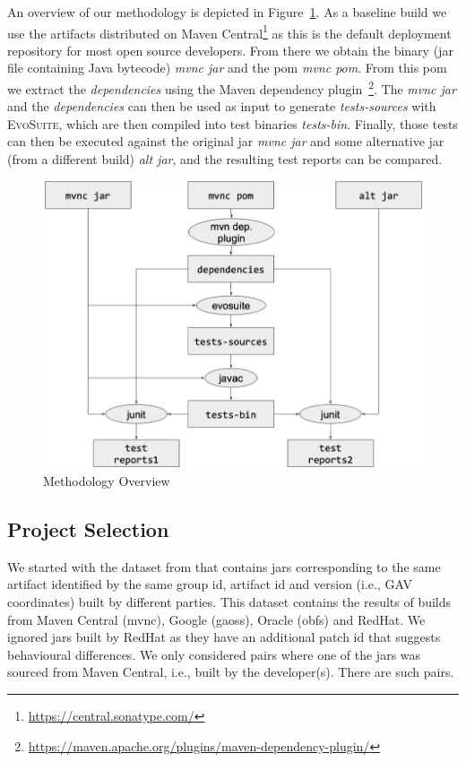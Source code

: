 \documentclass[conference]{IEEEtran}
\makeatletter
\newcommand{\evosuite}{\textsc{EvoSuite}\@\xspace}
\newcommand{\inputgen}[1]{\unskip}
\makeatother
\begin{document}
An overview of our methodology is depicted in Figure~\ref{fig:methodology}.  As a baseline build we use the artifacts distributed on Maven Central\footnote{\url{https://central.sonatype.com/}} as this is the default deployment repository for most open source developers.  From there we obtain the binary (jar file containing Java bytecode) \textit{mvnc jar} and the pom \textit{mvnc pom}. From this pom we extract the \textit{dependencies} using the Maven dependency plugin~\footnote{\url{https://maven.apache.org/plugins/maven-dependency-plugin/}}.  The \textit{mvnc jar} and the \textit{dependencies} can then be used as input to generate \textit{tests-sources} with \evosuite, which are then compiled into test binaries \textit{tests-bin}.  Finally, those tests can then be executed against the original jar \textit{mvnc jar} and some alternative jar (from a different build) \textit{alt jar}, and the resulting test reports can be compared.

\begin{figure}[ht!]
	\centering
	\includegraphics[width=\columnwidth]{methodology.jpg}
	\caption{Methodology Overview \label{fig:methodology}}
\end{figure}


\subsection{Project Selection}

We started with the dataset from \cite{dietrich2024levelsbinaryequivalencecomparison} that contains jars corresponding to the same artifact identified by the same group id, artifact id and version (i.e., GAV coordinates) built by different parties. This dataset contains the results of builds from Maven Central (mvnc), Google (gaoss), Oracle (obfs) and  RedHat. We ignored jars built by RedHat as they have an additional patch id that suggests behavioural differences.  We only considered pairs where one of the jars was sourced from Maven Central, i.e., built by the developer(s). There are \inputgen{num-pairs-of-binaries} such pairs.
\end{document}
